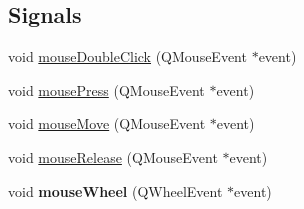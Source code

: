 \subsection*{Signals}
\begin{DoxyCompactItemize}
\item 
void \hyperlink{class_q_custom_plot_a9b232142c64fcf273a953ee08e5b90e9}{mouse\+Double\+Click} (Q\+Mouse\+Event $\ast$event)
\item 
void \hyperlink{class_q_custom_plot_aca75bf9afb5dd19349c375de2a87a051}{mouse\+Press} (Q\+Mouse\+Event $\ast$event)
\item 
void \hyperlink{class_q_custom_plot_a742ca4f94688bed2a685fd8a56ce5704}{mouse\+Move} (Q\+Mouse\+Event $\ast$event)
\item 
void \hyperlink{class_q_custom_plot_ac8dc0ee6bb98e923c00b4ebafbe6134d}{mouse\+Release} (Q\+Mouse\+Event $\ast$event)
\item 
void {\bfseries mouse\+Wheel} (Q\+Wheel\+Event $\ast$event)\hypertarget{class_q_custom_plot_ac80a14206f99304a91d2aa55775ec3ff}{}\label{class_q_custom_plot_ac80a14206f99304a91d2aa55775ec3ff}


\end{DoxyCompactItemize}
